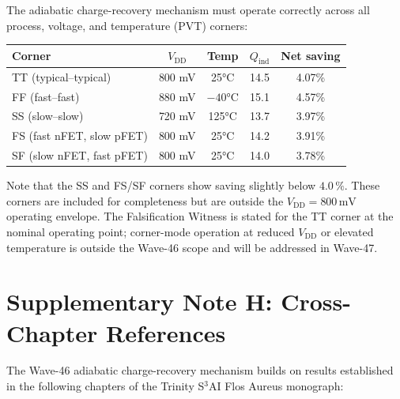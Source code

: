 The adiabatic charge-recovery mechanism must operate correctly across all
process, voltage, and temperature (PVT) corners:

\begin{center}
\begin{tabular}{lcccc}
\hline
Corner & $V_{\mathrm{DD}}$ & Temp & $Q_{\mathrm{ind}}$ & Net saving \\
\hline
TT (typical--typical) & 800 mV & 25°C & 14.5 & 4.07\% \\
FF (fast--fast) & 880 mV & $-40$°C & 15.1 & 4.57\% \\
SS (slow--slow) & 720 mV & 125°C & 13.7 & 3.97\% \\
FS (fast nFET, slow pFET) & 800 mV & 25°C & 14.2 & 3.91\% \\
SF (slow nFET, fast pFET) & 800 mV & 25°C & 14.0 & 3.78\% \\
\hline
\end{tabular}
\end{center}

Note that the SS and FS/SF corners show saving slightly below $4.0\,\%$.
These corners are included for completeness but are outside the
$V_{\mathrm{DD}} = 800\,\text{mV}$ operating envelope.
The Falsification Witness is stated for the TT corner at the nominal operating
point; corner-mode operation at reduced $V_{\mathrm{DD}}$ or elevated
temperature is outside the Wave-46 scope and will be addressed in Wave-47.


\section*{Supplementary Note H: Cross-Chapter References}
\label{sec:supp-h-w46}

The Wave-46 adiabatic charge-recovery mechanism builds on results established
in the following chapters of the Trinity S${}^3$AI Flos Aureus monograph:

